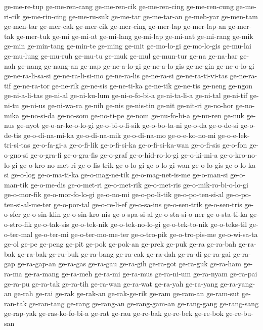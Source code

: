 {ge-me-re-tup ge-me-ren-cang ge-me-ren-cik ge-me-ren-cing ge-me-ren-cung
ge-me-ri-cik ge-me-rin-cing ge-me-ru-suk ge-me-tar ge-me-tar-an ge-meb-yar
ge-men-tam ge-men-tar ge-mer-cak ge-mer-cik ge-mer-cing ge-mer-lap
ge-mer-lap-an ge-mer-tak ge-mer-tuk ge-mi ge-mi-at ge-mi-lang ge-mi-lap
ge-mi-nat ge-mi-rang ge-mik ge-min ge-min-tang ge-min-te ge-ming ge-mit
ge-mo-lo-gi ge-mo-lo-gis ge-mu-lai ge-mu-lung ge-mu-ruh ge-mu-tu ge-muk
ge-mul ge-mun-tur ge-na ge-na-har ge-nah ge-nang ge-nang-an ge-nap
ge-ne-a-lo-gi ge-ne-a-lo-gis ge-ne-gin ge-ne-o-lo-gi ge-ne-ra-li-sa-si
ge-ne-ra-li-si-mo ge-ne-ra-lis ge-ne-ra-si ge-ne-ra-ti-vi-tas ge-ne-ra-tif
ge-ne-ra-tor ge-ne-rik ge-ne-sis ge-ne-ti-ka ge-ne-tik ge-ne-tis ge-neng
ge-ngon ge-ni-a-li-tas ge-ni-al ge-ni-ku-lum ge-ni-o-fo-bi-a ge-ni-ta-li-a
ge-ni-tal ge-ni-tif ge-ni-tu ge-ni-us ge-ni-wa-ra ge-nih ge-nis ge-nis-tin
ge-nit ge-nit-ri ge-no-hor ge-no-mika ge-no-si-da ge-no-som ge-no-ti-pe
ge-nom ge-nu-fo-bi-a ge-nu-ren ge-nuk ge-nus ge-nyot ge-o-ar-ke-o-lo-gi
ge-o-bi-o-fi-sik ge-o-bo-ta-ni ge-o-da ge-o-de-si ge-o-de-tis
ge-o-di-na-mi-ka ge-o-di-na-mik ge-o-di-na-mo ge-o-e-ko-no-mi
ge-o-e-lek-tri-si-tas ge-o-fa-gi-a ge-o-fi-lik ge-o-fi-si-ka
ge-o-fi-si-ka-wan ge-o-fi-sis ge-o-fon ge-o-gno-si ge-o-gra-fi
ge-o-gra-fis ge-o-graf ge-o-hid-ro-lo-gi ge-o-ki-mi-a ge-o-kro-no-lo-gi
ge-o-kro-no-met-ri ge-o-lis-trik ge-o-lo-gi ge-o-lo-gi-wan ge-o-lo-gis
ge-o-lo-ka-si ge-o-log ge-o-ma-ti-ka ge-o-mag-ne-tik ge-o-mag-net-is-me
ge-o-man-si ge-o-man-tik ge-o-me-dis ge-o-met-ri ge-o-met-rik ge-o-met-ris
ge-o-mik-ro-bi-o-lo-gi ge-o-mor-fik ge-o-mor-fo-lo-gi ge-o-no-mi
ge-o-po-li-tik ge-o-po-ten-si-al ge-o-po-ten-si-al-me-ter ge-o-por-tal
ge-o-re-li-ef ge-o-sa-ins ge-o-sen-trik ge-o-sen-tris ge-o-sfer
ge-o-sin-klin ge-o-sin-kro-nis ge-o-spa-si-al ge-o-sta-si-o-ner
ge-o-sta-ti-ka ge-o-stro-fik ge-o-tak-sis ge-o-tek-nik ge-o-tek-no-lo-gi
ge-o-tek-to-nik ge-o-teks-til ge-o-ter-mal ge-o-ter-mi ge-o-ter-mo-me-ter
ge-o-tro-pik ge-o-tro-pis-me ge-o-wi-sa-ta ge-ol ge-pe ge-peng ge-pit
ge-pok ge-pok-an ge-prek ge-puk ge-ra ge-ra-bah ge-ra-bak
ge-ra-bak-ge-ru-buk ge-ra-bang ge-ra-cak ge-ra-dah ge-ra-di ge-ra-gai
ge-ra-gap ge-ra-gap-an ge-ra-gas ge-ra-gau ge-ra-gih ge-ra-got ge-ra-guk
ge-ra-ham ge-ra-ma ge-ra-mang ge-ra-meh ge-ra-mi ge-ra-mus ge-ra-ni-um
ge-ra-nyam ge-ra-pai ge-ra-pu ge-ra-tak ge-ra-tih ge-ra-wan ge-ra-wat
ge-ra-yah ge-ra-yang ge-ra-yang-an ge-rah ge-rai ge-rak ge-rak-an
ge-rak-ge-rik ge-ram ge-ram-an ge-ram-sut ge-ran-tak ge-ran-tang ge-rang
ge-rang-an ge-rang-gam-an ge-rang-gang ge-rang-sang ge-rap-yak
ge-ras-ko-fo-bi-a ge-rat ge-rau ge-re-bak ge-re-bek ge-re-bok ge-re-bu-san
}
